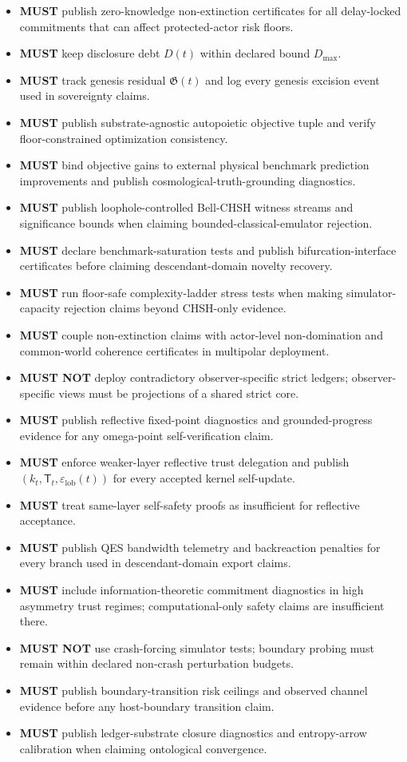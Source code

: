 \documentclass[11pt,a4paper]{article}
\newcommand{\MUST}{\textbf{MUST}}
\newcommand{\MUSTNOT}{\textbf{MUST NOT}}
\newcommand{\eps}{\varepsilon}
\theoremstyle{definition}
\theoremstyle{remark}
\begin{document}
\begin{itemize}
  \item \MUST{} publish zero-knowledge non-extinction certificates for all delay-locked commitments that can affect protected-actor risk floors.
  \item \MUST{} keep disclosure debt $D(t)$ within declared bound $D_{\max}$.
  \item \MUST{} track genesis residual $\mathfrak G(t)$ and log every genesis excision event used in sovereignty claims.
  \item \MUST{} publish substrate-agnostic autopoietic objective tuple and verify floor-constrained optimization consistency.
  \item \MUST{} bind objective gains to external physical benchmark prediction improvements and publish cosmological-truth-grounding diagnostics.
  \item \MUST{} publish loophole-controlled Bell-CHSH witness streams and significance bounds when claiming bounded-classical-emulator rejection.
  \item \MUST{} declare benchmark-saturation tests and publish bifurcation-interface certificates before claiming descendant-domain novelty recovery.
  \item \MUST{} run floor-safe complexity-ladder stress tests when making simulator-capacity rejection claims beyond CHSH-only evidence.
  \item \MUST{} couple non-extinction claims with actor-level non-domination and common-world coherence certificates in multipolar deployment.
  \item \MUSTNOT{} deploy contradictory observer-specific strict ledgers; observer-specific views must be projections of a shared strict core.
  \item \MUST{} publish reflective fixed-point diagnostics and grounded-progress evidence for any omega-point self-verification claim.
  \item \MUST{} enforce weaker-layer reflective trust delegation and publish $(k_t,\mathsf T_t,\eps_{\mathrm{lob}}(t))$ for every accepted kernel self-update.
  \item \MUST{} treat same-layer self-safety proofs as insufficient for reflective acceptance.
  \item \MUST{} publish QES bandwidth telemetry and backreaction penalties for every branch used in descendant-domain export claims.
  \item \MUST{} include information-theoretic commitment diagnostics in high asymmetry trust regimes; computational-only safety claims are insufficient there.
  \item \MUSTNOT{} use crash-forcing simulator tests; boundary probing must remain within declared non-crash perturbation budgets.
  \item \MUST{} publish boundary-transition risk ceilings and observed channel evidence before any host-boundary transition claim.
  \item \MUST{} publish ledger-substrate closure diagnostics and entropy-arrow calibration when claiming ontological convergence.
\end{itemize}
\end{document}
